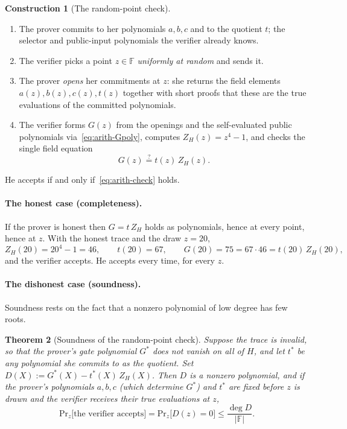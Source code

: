 \documentclass[11pt,a4paper]{article}
\newtheorem{theorem}{Theorem}[section]
\theoremstyle{definition}
\newtheorem{construction}[theorem]{Construction}
\newcommand{\F}{\mathbb{F}}
\renewcommand{\Pr}{\mathrm{Pr}}
\newcommand{\ZH}{Z_H}
\begin{document}
\begin{construction}[The random-point check]
\begin{enumerate}[leftmargin=*, itemsep=1pt]
\item The prover commits to her polynomials $a, b, c$ and to the quotient
  $t$; the selector and public-input polynomials the verifier already
  knows.
\item The verifier picks a point $z \in \F$ \emph{uniformly at random} and
  sends it.
\item The prover \emph{opens} her commitments at $z$: she returns the field
  elements $a(z), b(z), c(z), t(z)$ together with short proofs that these
  are the true evaluations of the committed polynomials.
\item The verifier forms $G(z)$ from the openings and the self-evaluated
  public polynomials via~\eqref{eq:arith-Gpoly}, computes
  $\ZH(z) = z^4 - 1$, and checks the single field equation
  \begin{equation}\label{eq:arith-check}
  G(z) \overset{?}{=} t(z)\,\ZH(z).
  \end{equation}
\end{enumerate}
He accepts if and only if~\eqref{eq:arith-check} holds.
\end{construction}

\paragraph{The honest case (completeness).}
If the prover is honest then $G = t\,\ZH$ holds as polynomials, hence at
every point, hence at $z$. With the honest trace and the draw $z = 20$,
\[
\ZH(20) = 20^4 - 1 = 46, \qquad t(20) = 67, \qquad
G(20) = 75 = 67 \cdot 46 = t(20)\,\ZH(20),
\]
and the verifier accepts. He accepts every time, for every $z$.

\paragraph{The dishonest case (soundness).}
Soundness rests on the fact that a nonzero polynomial of low degree has
few roots.

\begin{theorem}[Soundness of the random-point check]\label{thm:arith-random}
Suppose the trace is invalid, so that the prover's gate polynomial $G^{*}$
does not vanish on all of $H$, and let $t^{*}$ be any polynomial she
commits to as the quotient. Set $D(X) := G^{*}(X) - t^{*}(X)\,\ZH(X)$.
Then $D$ is a nonzero polynomial, and if the prover's polynomials
$a, b, c$ (which determine $G^{*}$) and $t^{*}$ are fixed before $z$ is
drawn and the verifier receives their true evaluations at $z$,
\[
\Pr_{z}\bigl[\text{the verifier accepts}\bigr]
  = \Pr_{z}\bigl[D(z) = 0\bigr] \le \frac{\deg D}{|\F|} .
\]
\end{theorem}
\end{document}
